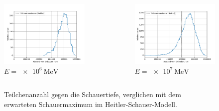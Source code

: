 \documentclass[aspectratio=1610, captions=tableheading, 11pt]{beamer}
\begin{document}
\begin{frame}
   \vspace{-3mm}
  \begin{columns}
    \begin{column}{0.5\textwidth}
      \begin{figure}
          \centering
          \includegraphics[height=0.7\textheight]{shower_presentation/hist_1e5.pdf}
          \caption*{$E = \SI{e6}{\mega\electronvolt}$}
      \end{figure}
    \end{column}

    \begin{column}{0.5\textwidth}
      \begin{figure}
          \centering
          \includegraphics[height=0.7\textheight]{shower_presentation/hist_1e6.pdf}
          \caption*{$E = \SI{e7}{\mega\electronvolt}$}
      \end{figure}    
    \end{column}
  \end{columns}
  \begin{figure}
  \caption*{Teilchenanzahl gegen die Schauertiefe, verglichen mit dem erwarteten Schauermaximum im Heitler-Schauer-Modell.}
  \end{figure}
\end{frame}
\end{document}

